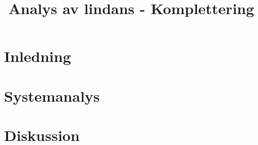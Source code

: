 \documentclass[usenames,dvipsnames]{article}
\begin{document}
\title{Analys av lindans - Komplettering}
\maketitle



\tableofcontents\thispagestyle{empty}
\clearpage

\section{Inledning}


\newpage\section{Systemanalys}


\newpage\section{Diskussion}

\end{document}
